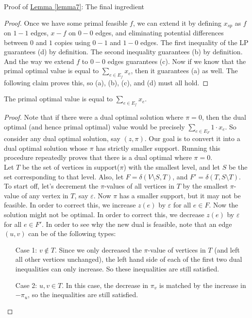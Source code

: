 \documentclass[./main.tex]{subfiles}
\begin{document}
\begin{subsection}{Proof of \hyperref[lemma7]{Lemma \ref{lemma7}}: The final ingredient}
\begin{proof}
Once we have some primal feasible $f$, we can extend it by defining $x_{sp}$ as $f$ on $1-1$ edges, $x-f$ on $0-0$ edges, and eliminating potential differences between $0$ and $1$ copies using $0-1$ and $1-0$ edges. 
The first inequality of the LP guarantees (d) by definition. 
The second inequality guarantees (b) by definition. And the way we extend $f$ to $0-0$ edges guarantees (c). 
Now if we know that the primal optimal value is equal to $\sum_{e\in E_f}x_e$, then it guarantees (a) as well. The following claim proves this, so (a), (b), (c), and (d) must all hold.	\end{proof}
\vspace{2mm}
	\begin{claim}
		The primal optimal value is equal to $\sum_{e\in E_f}x_e$.
	\end{claim}
	\begin{proof}
		Note that if there were a dual optimal solution where $\pi = 0$, then the dual optimal (and hence primal optimal) value would be precisely $\sum_{e\in E_F}1\cdot x_e$. 
		So consider any dual optimal solution, say $(z,\pi)$. Our goal is to convert it into a dual optimal solution whose $\pi$ has strictly smaller support. 
		Running this procedure repeatedly proves that there is a dual optimal where $\pi = 0$.\vspace{2mm}
		\\Let $T$ be the set of vertices in support($\pi$) with the smallest level, and let $S$ be the set corresponding to that level.
		Also, let $F = \delta(V\setminus S, T)$, and $F' = \delta(T,S\setminus T)$.
		\\To start off, let's decrement the $\pi$-values of all vertices in $T$ by the smallest $\pi$-value of any vertex in $T$, say $\varepsilon$. Now $\pi$ has a smaller support, but it may not be feasible. In order to correct this, we increase $z(e)$ by $\varepsilon$ for all $e\in F$. Now the solution might not be optimal. In order to correct this, we decrease $z(e)$ by $\varepsilon$ for all $e\in F'$. In order to see why the new dual is feasible, note that an edge $(u,v)$ can be of the following types:
		\begin{itemize}
		\item[Case 1:] $v\notin T$. Since we only decreased the $\pi$-value of vertices in $T$ (and left all other vertices unchanged), the left hand side of each of the first two dual inequalities can only increase. So these inequalities are still satisfied.
		\item[Case 2:] $u,v\in T$. In this case, the decrease in $\pi_v$ is matched by the increase in $-\pi_u$, so the inequalities are still satisfied.

\end{itemize}
\end{proof}
\end{subsection}
\end{document}
